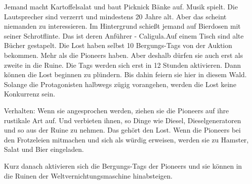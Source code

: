 Jemand macht Kartoffelsalat und baut Picknick Bänke auf. Musik spielt. Die Lautsprecher sind verzerrt und mindestens 20 Jahre alt. Aber das scheint niemanden zu interessieren. Im Hintergrund schießt jemand auf Bierdosen mit seiner Schrotflinte. Das ist deren Anführer - Caligula.Auf einem Tisch sind alte Bücher gestapelt.
Die Lost haben selbst 10 Bergungs-Tags von der Auktion bekommen. Mehr als die Pioneers haben. Aber deshalb dürfen sie auch erst als zweite in die Ruine. Die Tags werden sich erst in 12 Stunden aktivieren. Dann können die Lost beginnen zu plündern. Bis dahin feiern sie hier in diesem Wald. Solange die Protagonisten halbwegs zügig vorangehen, werden die Lost keine Konkurrenz sein.

Verhalten: Wenn sie angesprochen werden, ziehen sie die Pioneers auf ihre rustikale Art auf. Und verbieten ihnen, so Dinge wie Diesel, Dieselgeneratoren und so aus der Ruine zu nehmen. Das gehört den Lost. Wenn die Pioneers bei den Frotzeleien mitmachen und sich als würdig erweisen, werden sie zu Hamster, Salat und Bier eingeladen.

Kurz danach aktivieren sich die Bergungs-Tags der Pioneers und sie können in die Ruinen der Weltvernichtungsmaschine hinabsteigen.

